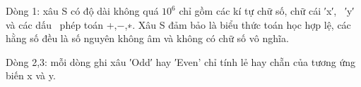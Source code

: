 Dòng 1: xâu S có độ dài không quá $10^{6}$   chỉ gồm các kí tự chữ số, chữ cái ′x′,  ′y′ và các dấu  phép toán +,−,∗. Xâu S đảm bảo là biểu thức toán học hợp lệ, các hằng số đều là số nguyên không âm và không có chữ số vô nghĩa.  

   Dòng 2,3: mỗi dòng ghi xâu ′Odd′ hay ′Even' chỉ tính lẻ hay chẵn của tương ứng biến x và y.